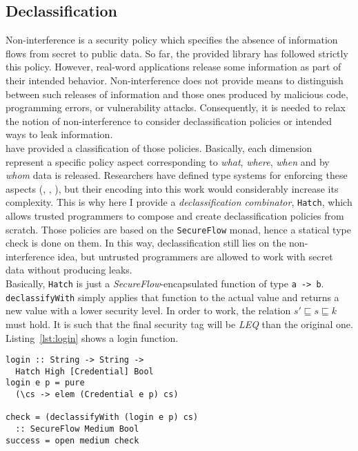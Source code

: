 \subsection{Declassification}
Non-interference is a security policy which specifies the absence of information flows from secret to public data. So far, the provided library has followed strictly this policy. However, real-word applications release some information as part of their intended behavior. Non-interference does not provide means to distinguish between such releases of information and those ones produced by malicious code, programming errors, or vulnerability attacks. Consequently, it is needed to relax the notion of non-interference to consider declassification policies or intended ways to leak information. \\
\citeauthor{sabelfeld2005dimensions} \cite{sabelfeld2005dimensions} have provided a classification of those policies. Basically, each dimension represent a specific policy aspect corresponding to \textit{what}, \textit{where}, \textit{when} and by \textit{whom} data is released. Researchers have defined type systems for enforcing these aspects (\cite{banerjee2008expressive}, \cite{zdancewic2001robust}, \cite{zdancewic2003type}), but their encoding into this work would considerably increase its complexity. This is why here I provide a \textit{declassification combinator}, \texttt{Hatch}, which allows trusted programmers to compose and create declassification policies from scratch. Those policies are based on the \texttt{SecureFlow} monad, hence a statical type check is done on them. In this way, declassification still lies on the non-interference idea, but untrusted programmers are allowed to work with secret data without producing leaks.\\
Basically, \texttt{Hatch} is just a \textit{SecureFlow}-encapsulated function of type \texttt{a -> b}. \texttt{declassifyWith} simply applies that function to the actual value and returns a new value with a lower security level. In order to work, the relation $s' \sqsubseteq s \sqsubseteq k$ must hold. It is such that the final security tag will be \textit{LEQ} than the original one. \\
Listing~\ref{lst:login} shows a login function.
\begin{lstlisting}[caption={Declassificated login}, label={lst:login}]
login :: String -> String -> 
  Hatch High [Credential] Bool
login e p = pure
  (\cs -> elem (Credential e p) cs)

check = (declassifyWith (login e p) cs)
  :: SecureFlow Medium Bool
success = open medium check
\end{lstlisting}

